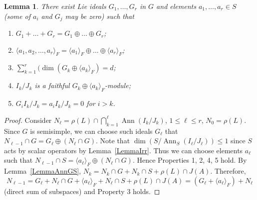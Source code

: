 \documentclass[12pt, reqno, a4paper]{amsart}
\theoremstyle{plain}
\newtheorem{lemma}{Lemma}
\theoremstyle{remark}
\theoremstyle{definition}
\begin{document}
\begin{lemma}\label{LemmaChooseai}
There exist Lie ideals $G_1, \ldots, G_r$
in $G$ and elements $a_1,\ldots,a_r \in S$
(some of $a_i$ and $G_j$ may be zero)
such that
\begin{enumerate}
\item $G_1+ \ldots + G_r=G_1\oplus \ldots \oplus G_r$;
\item $\langle a_1, a_2, \ldots, a_r \rangle_F = \langle a_1 \rangle_F \oplus \ldots \oplus \langle a_r\rangle_F$;
\item $\sum\limits_{k=1}^r(\dim (G_k\oplus \langle a_k \rangle_F) = d$;
\item $I_k/J_k$ is a faithful $G_k\oplus \langle a_k \rangle_F$-module;
\item $G_i I_k/J_k = a_i I_k/J_k = 0$ for $i > k$.
\end{enumerate}
\end{lemma}
\begin{proof}
Consider $N_\ell = \rho(L) \cap \bigcap\limits_{k=1}^\ell \operatorname{Ann} (I_k/J_k)$,
$1 \leqslant \ell \leqslant r$, $N_0 = \rho(L)$.
Since $G$ is semisimple, we can choose such ideals $G_\ell$
that $N_{\ell-1} \cap G = G_\ell \oplus (N_\ell \cap G)$.
Note that $\dim(S/\operatorname{Ann}_S (I_\ell/J_\ell)) \leqslant 1$
since $S$ acts by scalar operators by Lemma~\ref{LemmaIrr}. Thus we
can choose elements $a_\ell$ such
that $N_{\ell-1} \cap S = \langle a_\ell \rangle_F \oplus (N_\ell \cap G)$.
Hence Properties 1, 2, 4, 5 hold.
 By Lemma~\ref{LemmaAnnGS},
 $N_k = N_k \cap G + N_k \cap S + \rho(L) \cap J(A)$.
 Therefore, $$N_{\ell-1} = G_\ell + N_\ell \cap G + \langle a_\ell \rangle_F +
   N_\ell \cap S + \rho(L) \cap J(A)
   = (G_\ell+\langle a_\ell \rangle_F)+N_\ell$$
   (direct sum of subspaces) and Property 3 holds.
\end{proof}
\end{document}
